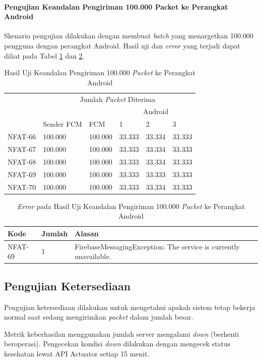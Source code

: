 \paragraph{Pengujian Keandalan Pengiriman 100.000 Packet ke Perangkat Android}
\par Skenario pengujian dilakukan dengan membuat \textit{batch} yang menargetkan 100.000 pengguna dengan perangkat Android. Hasil uji dan \textit{error} yang terjadi dapat diliat pada Tabel \ref{t:keandalan-android-100k} dan \ref{t:error-keandalan-android-100k}.
\begin{longtable}{|p{1.5cm}|p{2cm}|p{1.5cm}|p{1cm}|p{1cm}|p{1cm}|}
	\caption{Hasil Uji Keandalan Pengiriman 100.000 \textit{Packet} ke Perangkat Android} \label{t:keandalan-android-100k} \\ \hline
	\rowcolor{lightgray} & \multicolumn{5}{c|}{Jumlah \textit{Packet} Diterima} \\ \hhline{~|*5{-}|}
	\rowcolor{lightgray} & & & \multicolumn{3}{c|}{Android} \\ \hhline{~~~|*3{-}|}
	\rowcolor{lightgray} \multirow{-3}{*}{Kode} & \multirow{-2}{*}{Sender FCM} & \multirow{-2}{*}{FCM} & 1 & 2 & 3 \\ \hline
	\endhead
	NFAT-66 & 100.000 & 100.000 & 33.333 & 33.334 & 33.333 \\ \hline
	NFAT-67 & 100.000 & 100.000 & 33.333 & 33.334 & 33.333 \\ \hline
	NFAT-68 & 100.000 & 100.000 & 33.333 & 33.334 & 33.333 \\ \hline
	NFAT-69 & 100.000 & 100.000 & 33.333 & 33.333 & 33.333 \\ \hline
	NFAT-70 & 100.000 & 100.000 & 33.333 & 33.334 & 33.333 \\ \hline
\end{longtable}

\begin{longtable}{|p{1.5cm}|p{1.5cm}|p{5cm}|}
	\caption{\textit{Error} pada Hasil Uji Keandalan Pengiriman 100.000 \textit{Packet} ke Perangkat Android} \label{t:error-keandalan-android-100k} \\ \hline
	\rowcolor{lightgray} Kode & Jumlah & Alasan \\ \hline
	\endhead
	NFAT-69 & 1 & FirebaseMessagingException: The service is currently unavailable. \\ \hline
\end{longtable}

\subsection{Pengujian Ketersediaan}
\par Pengujian ketersediaan dilakukan untuk mengetahui apakah sistem tetap bekerja normal saat sedang mengirimkan \textit{packet} dalam jumlah besar.
\par Metrik keberhasilan menggunakan jumlah server mengalami \textit{down} (berhenti beroperasi). Pengecekan kondisi \textit{down} dilakukan dengan mengecek status kesehatan lewat API Actuator setiap 15 menit.

